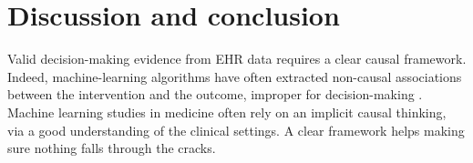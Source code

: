 \documentclass[10pt,letterpaper]{article}
\begin{document}
\section*{Discussion and conclusion}\label{sec:discussion}


Valid decision-making evidence from EHR data requires a clear causal framework.
Indeed, machine-learning algorithms have often extracted non-causal associations
between the intervention and the outcome, improper for decision-making
\cite{winkler2019association,badgeley2019deep,obermeyer2019dissecting}.
Machine learning studies in medicine often rely on an implicit causal
thinking, via a good understanding of the clinical settings.
A clear framework helps making
sure nothing falls through the cracks.
\end{document}
